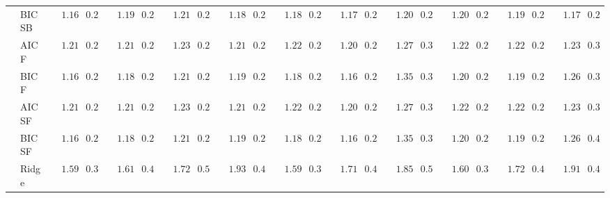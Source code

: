 \begin{tabular}{ll|ll|llllll|llllll|llllll}
 & BIC SB  & $\phantom{00}1.16$ & $\phantom{0}0.24$ & $\phantom{00}1.19$ & $\phantom{0}0.24$ & $\phantom{00}1.21$ & $\phantom{0}0.27$ & $\phantom{00}1.18$ & $\phantom{0}0.27$ & $\phantom{00}1.18$ & $\phantom{0}0.28$ & $\phantom{00}1.17$ & $\phantom{0}0.24$ & $\phantom{00}1.20$ & $\phantom{0}0.25$ & $\phantom{00}1.20$ & $\phantom{0}0.28$ & $\phantom{00}1.19$ & $\phantom{0}0.25$ & $\phantom{00}1.17$ & $\phantom{0}0.26$ \\
 & AIC F  & $\phantom{00}1.21$ & $\phantom{0}0.25$ & $\phantom{00}1.21$ & $\phantom{0}0.25$ & $\phantom{00}1.23$ & $\phantom{0}0.26$ & $\phantom{00}1.21$ & $\phantom{0}0.25$ & $\phantom{00}1.22$ & $\phantom{0}0.27$ & $\phantom{00}1.20$ & $\phantom{0}0.25$ & $\phantom{00}1.27$ & $\phantom{0}0.30$ & $\phantom{00}1.22$ & $\phantom{0}0.26$ & $\phantom{00}1.22$ & $\phantom{0}0.25$ & $\phantom{00}1.23$ & $\phantom{0}0.31$ \\
 & BIC F  & $\phantom{00}1.16$ & $\phantom{0}0.25$ & $\phantom{00}1.18$ & $\phantom{0}0.24$ & $\phantom{00}1.21$ & $\phantom{0}0.27$ & $\phantom{00}1.19$ & $\phantom{0}0.27$ & $\phantom{00}1.18$ & $\phantom{0}0.27$ & $\phantom{00}1.16$ & $\phantom{0}0.23$ & $\phantom{00}1.35$ & $\phantom{0}0.38$ & $\phantom{00}1.20$ & $\phantom{0}0.28$ & $\phantom{00}1.19$ & $\phantom{0}0.25$ & $\phantom{00}1.26$ & $\phantom{0}0.39$ \\
 & AIC SF  & $\phantom{00}1.21$ & $\phantom{0}0.25$ & $\phantom{00}1.21$ & $\phantom{0}0.25$ & $\phantom{00}1.23$ & $\phantom{0}0.26$ & $\phantom{00}1.21$ & $\phantom{0}0.25$ & $\phantom{00}1.22$ & $\phantom{0}0.27$ & $\phantom{00}1.20$ & $\phantom{0}0.25$ & $\phantom{00}1.27$ & $\phantom{0}0.30$ & $\phantom{00}1.22$ & $\phantom{0}0.26$ & $\phantom{00}1.22$ & $\phantom{0}0.25$ & $\phantom{00}1.23$ & $\phantom{0}0.31$ \\
 & BIC SF  & $\phantom{00}1.16$ & $\phantom{0}0.25$ & $\phantom{00}1.18$ & $\phantom{0}0.24$ & $\phantom{00}1.21$ & $\phantom{0}0.27$ & $\phantom{00}1.19$ & $\phantom{0}0.27$ & $\phantom{00}1.18$ & $\phantom{0}0.27$ & $\phantom{00}1.16$ & $\phantom{0}0.23$ & $\phantom{00}1.35$ & $\phantom{0}0.38$ & $\phantom{00}1.20$ & $\phantom{0}0.28$ & $\phantom{00}1.19$ & $\phantom{0}0.25$ & $\phantom{00}1.26$ & $\phantom{0}0.40$ \\
 & Ridge  & $\phantom{00}1.59$ & $\phantom{0}0.35$ & $\phantom{00}1.61$ & $\phantom{0}0.41$ & $\phantom{00}1.72$ & $\phantom{0}0.50$ & $\phantom{00}1.93$ & $\phantom{0}0.42$ & $\phantom{00}1.59$ & $\phantom{0}0.37$ & $\phantom{00}1.71$ & $\phantom{0}0.40$ & $\phantom{00}1.85$ & $\phantom{0}0.52$ & $\phantom{00}1.60$ & $\phantom{0}0.38$ & $\phantom{00}1.72$ & $\phantom{0}0.46$ & $\phantom{00}1.91$ & $\phantom{0}0.48$ \\

\end{tabular}
